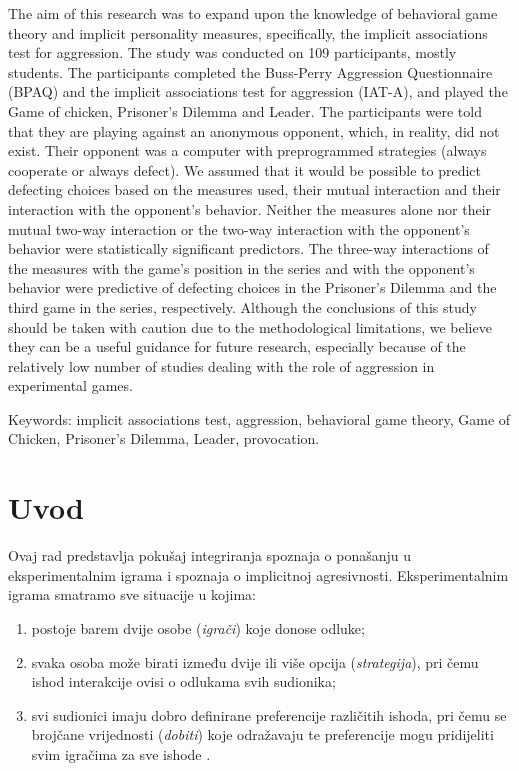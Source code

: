 \documentclass[a4paper, 12pt]{report}
\begin{document}
\begin{singlespace}
\noindent The aim of this research was to expand upon the knowledge of behavioral game theory
and implicit personality measures, specifically, the implicit associations test
for aggression. The study was conducted on 109 participants, mostly students.
The participants completed the Buss-Perry Aggression Questionnaire (BPAQ) and
the implicit associations test for aggression (IAT-A), and played the Game of
chicken, Prisoner's Dilemma and Leader. The participants were told that they are
playing against an anonymous opponent, which, in reality, did not exist. Their
opponent was a computer with preprogrammed strategies (always cooperate or
always defect). We assumed that it would be possible to predict defecting
choices based on the measures used, their mutual interaction and their
interaction with the opponent's behavior. Neither the measures alone nor their
mutual two-way interaction or the two-way interaction with the opponent's
behavior were statistically significant predictors. The three-way interactions
of the measures with the game's position in the series and with the opponent's
behavior were predictive of defecting choices in the Prisoner's Dilemma and the
third game in the series, respectively. Although the conclusions of this study
should be taken with caution due to the methodological limitations, we believe
they can be a useful guidance for future research, especially because of the
relatively low number of studies dealing with the role of aggression in
experimental games.
\bigskip

\noindent Keywords: implicit associations test, aggression, behavioral game
theory, Game of Chicken, Prisoner's Dilemma, Leader, provocation.
\end{singlespace}

\thispagestyle{empty}
\clearpage

\setcounter{page}{1}
\section{Uvod}

Ovaj rad predstavlja pokušaj integriranja spoznaja o ponašanju u
eksperimentalnim igrama i spoznaja o implicitnoj agresivnosti.
Eksperimentalnim igrama smatramo sve situacije u kojima: 
\begin{enumerate}[label = (\alph*)]
    \item postoje barem dvije osobe (\emph{igrači}) koje donose odluke;
    \item svaka osoba može birati između dvije ili više opcija
        (\emph{strategija}), pri čemu ishod
        interakcije ovisi o odlukama svih sudionika;
    \item svi sudionici imaju dobro definirane preferencije  različitih
        ishoda, pri čemu se brojčane vrijednosti (\emph{dobiti}) koje odražavaju te
        preferencije mogu pridijeliti svim igračima za sve ishode \citep{colgt}.
\end{enumerate}
\end{document}
